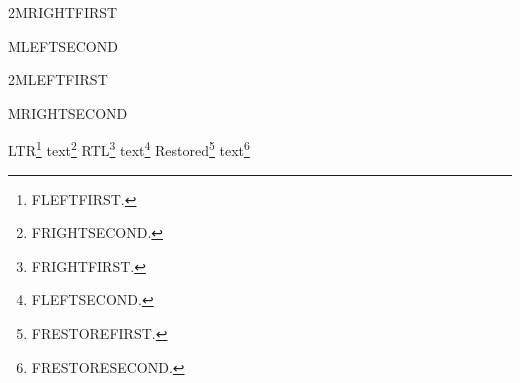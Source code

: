 \documentclass{article}
\newcommand\RTLmulticolcolumns{\relax}
\newcommand\LTRmulticolcolumns{\relax}
\begin{document}
\ifdefined\PredefinedRTL\else
  \RTLmulticolcolumns
  \begin{multicols}{2}MRIGHTFIRST\par\columnbreak MLEFTSECOND\par\end{multicols}
\fi
\ifdefined\PredefinedLTR\else
  \LTRmulticolcolumns
  \begin{multicols}{2}MLEFTFIRST\par\columnbreak MRIGHTSECOND\par\end{multicols}
\fi
\clearpage
\LTRdfnmakecol
LTR\footnote{FLEFTFIRST.} text\footnote{FRIGHTSECOND.}\clearpage
\begingroup
\RTLdfnmakecol
RTL\footnote{FRIGHTFIRST.} text\footnote{FLEFTSECOND.}\clearpage
\endgroup
Restored\footnote{FRESTOREFIRST.} text\footnote{FRESTORESECOND.}\clearpage
\end{document}
